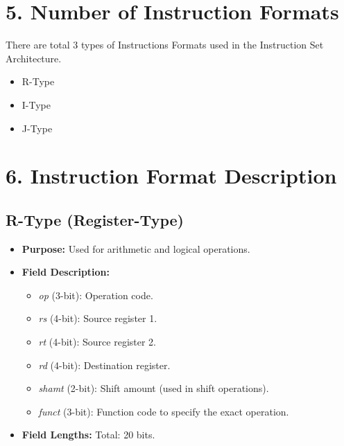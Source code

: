 \documentclass[12pt, onecolumn]{report}
\begin{document}
\hfill
\section*{5. Number of Instruction Formats}

There are total 3 types of Instructions Formats used in the Instruction Set Architecture.
\begin{itemize}
    \item R-Type 
    \item I-Type
    \item J-Type
\end{itemize}



\hfill
\section*{6. Instruction Format Description}

\subsection*{R-Type (Register-Type)}
\begin{itemize}
    \item \textbf{Purpose:} Used for arithmetic and logical operations.
    \item \textbf{Field Description:}
    \begin{itemize}
        \item \textit{op} (3-bit): Operation code.
        \item \textit{rs} (4-bit): Source register 1.
        \item \textit{rt} (4-bit): Source register 2.
        \item \textit{rd} (4-bit): Destination register.
        \item \textit{shamt} (2-bit): Shift amount (used in shift operations).
        \item \textit{funct} (3-bit): Function code to specify the exact operation.
    \end{itemize}
    \item \textbf{Field Lengths:} Total: 20 bits.
\end{itemize}
\end{document}
